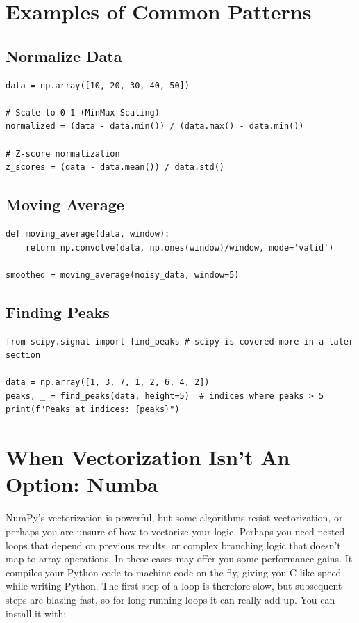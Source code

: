 \section{Examples of Common Patterns}
\label{sec:numpy-patterns}

\subsection{Normalize Data}

\begin{lstlisting}
data = np.array([10, 20, 30, 40, 50])

# Scale to 0-1 (MinMax Scaling)
normalized = (data - data.min()) / (data.max() - data.min())

# Z-score normalization
z_scores = (data - data.mean()) / data.std()
\end{lstlisting}

\subsection{Moving Average}

\begin{lstlisting}
def moving_average(data, window):
    return np.convolve(data, np.ones(window)/window, mode='valid')

smoothed = moving_average(noisy_data, window=5)
\end{lstlisting}

\subsection{Finding Peaks}

\begin{lstlisting}
from scipy.signal import find_peaks # scipy is covered more in a later section

data = np.array([1, 3, 7, 1, 2, 6, 4, 2])
peaks, _ = find_peaks(data, height=5)  # indices where peaks > 5
print(f"Peaks at indices: {peaks}")
\end{lstlisting}

\newpage
\section{When Vectorization Isn't An Option: Numba}
\label{sec:numba}

NumPy's vectorization is powerful, but some algorithms resist vectorization, or perhaps you are unsure of how to vectorize your logic. Perhaps you need nested loops that depend on previous results, or complex branching logic that doesn't map to array operations. In these cases  may offer you some performance gains. It compiles your Python code to machine code on-the-fly, giving you C-like speed while writing Python. The first step of a loop is therefore slow, but subsequent steps are blazing fast, so for long-running loops it can really add up. You can install it with:


